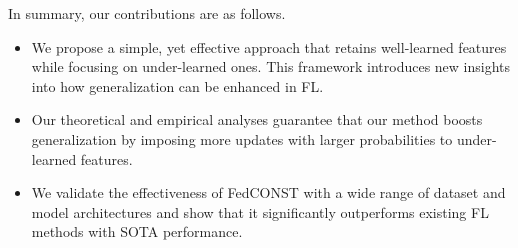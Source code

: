 \documentclass{article}
\theoremstyle{plain}
\theoremstyle{definition}
\theoremstyle{remark}
\begin{document}
 

In summary, our contributions are as follows.
\begin{itemize}
\item We propose a simple, yet effective approach that retains well-learned features while focusing on under-learned ones. This framework introduces new insights into how generalization can be enhanced in FL.%
\item Our theoretical and empirical analyses guarantee that our method boosts generalization by imposing more updates with larger probabilities to under-learned features.
\item We validate the effectiveness of FedCONST with a wide range of dataset and model architectures and show that it significantly outperforms existing FL methods with SOTA performance.
\end{itemize}
\vfill
\end{document}
